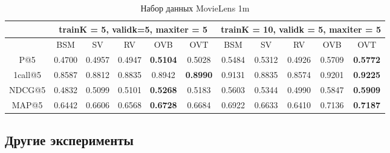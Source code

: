 \documentclass[a4paper,12pt]{article}
\begin{document}

\begin{table}[H]
\caption{Набор данных MovieLens 1m}
\label{tab:movm}
\begin{tabular}{|c|c|c|c|c|c|c|c|c|c|c|}
\hline
& \multicolumn{5}{|c|}{trainK = 5, validk=5, maxiter = 5} & \multicolumn{5}{|c|}{trainK = 10, validk = 5, maxiter = 5}\\
\hline
  & BSM  & SV &  RV & OVB & OVT &BSM  & SV & RV & OVB & OVT \\
\hline
P@5 & 0.4700 & 0.4957 &0.4947& \textbf{0.5104} &0.5028 & 0.5484& 0.5312& 0.4926&0.5709 & \textbf{0.5772}  \\
\hline
1call@5 & 0.8587 &0.8812 & 0.8835  &0.8942 &\textbf{0.8990}  & 0.9131& 0.8835& 0.8574& 0.9201&\textbf{0.9225} \\
\hline
NDCG@5 & 0.4832 & 0.5099& 0.5101&\textbf{0.5268} & 0.5183 & 0.5603 &0.5344 & 0.4990&0.5847 &\textbf{0.5909} \\
\hline
MAP@5 & 0.6442 & 0.6606& 0.6568& \textbf{0.6728}& 0.6684 & 0.6922& 0.6633& 0.6410& 0.7136&\textbf{0.7187} \\
\hline
\end{tabular}
\end{table}

\subsection*{Другие эксперименты}
\end{document}
